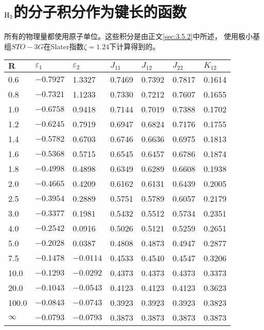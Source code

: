 \chapter{$\mathrm{H}_2$的分子积分作为键长的函数}
\label{appendix:d}
所有的物理量都使用原子单位。这些积分是由正文\autoref{sec:3.5.2}中所述，
使用极小基组$STO-3G$在Slater指数$\zeta=1.24$下计算得到的。
\begin{table}[h!] 
	\centering
	\begin{tabular}{lllllll}
		\hline 
		$\bm{R}$ & $\varepsilon_1 $& $\varepsilon_2 $
         & $J_{11}$ & $J_{12}$& $J_{22}$& $K_{12}$
         \\ \hline
          0.6&$-0.7927$&1.3327&0.7469&0.7392&0.7817&0.1614
        \\0.8&$-0.7321$&1.1233&0.7330&0.7212&0.7607&0.1655
        \\1.0&$-0.6758$&0.9418&0.7144&0.7019&0.7388&0.1702
        \\1.2&$-0.6245$&0.7919&0.6947&0.6824&0.7176&0.1755
        \\1.4&$-0.5782$&0.6703&0.6746&0.6636&0.6975&0.1813
        \\1.6&$-0.5368$&0.5715&0.6545&0.6457&0.6786&0.1874
        \\1.8&$-0.4998$&0.4898&0.6349&0.6289&0.6608&0.1938
        \\2.0&$-0.4665$&0.4209&0.6162&0.6131&0.6439&0.2005
        \\2.5&$-0.3954$&0.2889&0.5751&0.5789&0.6057&0.2179
        \\3.0&$-0.3377$&0.1981&0.5432&0.5512&0.5734&0.2351
        \\4.0&$-0.2542$&0.0916&0.5026&0.5121&0.5259&0.2651
        \\5.0&$-0.2028$&0.0387&0.4808&0.4873&0.4947&0.2877
        \\7.5&$-0.1478$&$-0.0114$&0.4533&0.4540&0.4547&0.3206
        \\10.0&$-0.1293$&$-0.0292$&0.4373&0.4373&0.4373&0.3373
        \\20.0&$-0.1043$&$-0.0543$&0.4123&0.4123&0.4123&0.3623
        \\100.0&$-0.0843$&$-0.0743$&0.3923&0.3923&0.3923&0.3823
        \\$\infty$&$-0.0793$&$-0.0793$&0.3873&0.3873&0.3873&0.3873
	\\ \hline
	\end{tabular}
	\label{tD.1}
\end{table}
